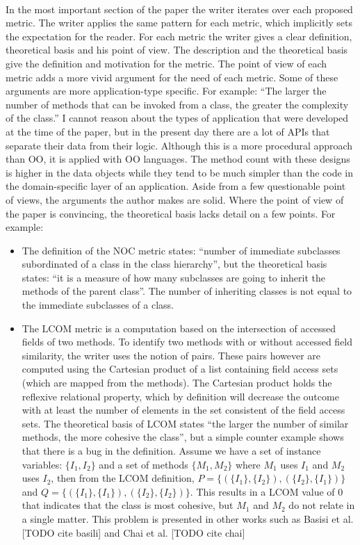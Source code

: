 \paragraph{}
In the most important section of the paper the writer iterates over each proposed metric. The writer applies the
same pattern for each metric, which implicitly sets the expectation for the reader. For each metric the writer gives a
clear definition, theoretical basis and his point of view. The description and the theoretical basis give the definition and
motivation for the metric. The point of view of each metric adds a more vivid argument for the need of each metric.
Some of these arguments are more application-type specific. For example: ``The larger the number of methods that can be
invoked from a class, the greater the complexity of the class.'' I cannot reason about the types of application that were
developed at the time of the paper, but in the present day there are a lot of APIs that separate their data from their
logic. Although this is a more procedural approach than OO, it is applied with OO languages. The method count
with these designs is higher in the data objects while they tend to be much simpler than the code in the domain-specific
layer of an application. Aside from a few questionable point of views, the arguments the author makes are solid.
Where the point of view of the paper is convincing, the theoretical basis lacks detail on a few points. For example:

\begin{itemize}
\item
The definition of the NOC metric states: ``number of immediate subclasses subordinated of a class in the class
hierarchy'', but the theoretical basis states: ``it is a measure of how many subclasses are going to inherit
the methods of the parent class''. The number of inheriting classes is not equal to the immediate subclasses of a
class.
\item
The LCOM metric is a computation based on the intersection of accessed fields of two methods. To identify two
methods with or without accessed field similarity, the writer uses the notion of pairs. These pairs however are
computed using the Cartesian product of a list containing field access sets (which are mapped from the
methods). The Cartesian product holds the reflexive relational property, which by definition will decrease
the outcome with at least the number of elements in the set consistent of the field access sets.
The theoretical basis of LCOM states ``the larger the number of similar methods, the more cohesive the class'',
but a simple counter example shows that there is a bug in the definition. Assume we have a set of instance
variables: $\{I_1, I_2\}$ and a set of methods $\{M_1, M_2\}$ where $M_1$ uses $I_1$ and $M_2$ uses $I_2$, then from
the LCOM definition, $P = \{( \{I_1\}, \{I_2\} ), ( \{I_2\}, \{I_1\} ) \}$ and
$Q = \{( \{I_1\}, \{I_1\} ), ( \{I_2\}, \{I_2\} ) \}$. This results in a LCOM value of $0$ that indicates that
the class is most cohesive, but $M_1$ and $M_2$ do not relate in a single matter. This problem is presented in other
works such as Basisi et al. [TODO cite basili] and Chai et al. [TODO cite chai]
\end{itemize}


